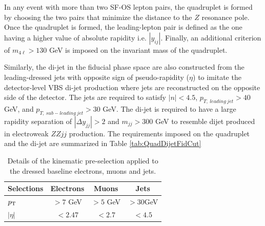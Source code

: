 In any event with more than two SF-OS lepton pairs, the quadruplet is formed by choosing the two pairs that minimize the distance to the $Z$ resonance pole. Once the quadruplet is formed, the leading-lepton pair is defined as the one having a higher value of absolute rapidity i.e. $|y_{ij}|$. Finally, an additional criterion of $m_{4\ell} > 130$ GeV is imposed on the invariant mass of the quadruplet. 

Similarly, the di-jet in the fiducial phase space are also constructed from the leading-dressed jets with opposite sign of pseudo-rapidity ($\eta$) to imitate the detector-level VBS di-jet production where jets are reconstructed on the opposite side of the detector. The jets are required to satisfy $|n| < 4.5$, $p_{T,~leading~jet} > 40$ GeV, and $p_{T,~sub-leading~jet} > 30$ GeV. The di-jet is required to have a large rapidity separation of $|\Delta y_{jj}| > 2$ and $m_{jj} > 300$ GeV to resemble dijet produced in electroweak $ZZjj$ production. The requirements imposed on the quadruplet and the di-jet are summarized in Table \ref{tab:QuadDijetFidCut}


\begin{table}[ht]
	\centering
	\caption{Details of the kinematic pre-selection applied to the dressed baseline electrons, muons and jets.
	\label{tab:FidObjectCut}}
	\begin{tabular}{|| l || c | c | c ||}
		\hline
		Selections 		& Electrons 			& 		Muons		 & 			Jets 			\\
		\hline\hline
		$p_{\textrm{T} ~}$ 			& $> 7$ GeV 			& 		$ >5$ GeV  	 & 		$>30$GeV 		\\
		\hline 
		$|\eta|$			&  $< 2.47	$			& 		$ < 2.7 $		 &		$ < 4.5$ 			\\
		\hline
	\end{tabular}
\end{table}				
	
